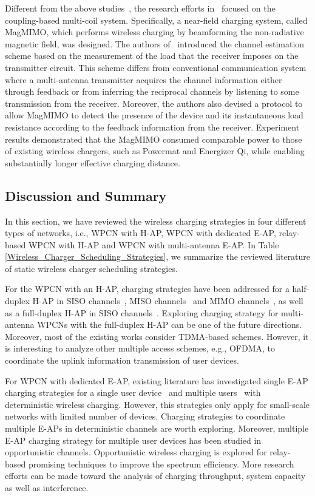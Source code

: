 \documentclass[twocolumn,10pt]{IEEEtran}
\begin{document}
Different from the above studies~\cite{G.YangTSP,Y.1403.7870Zeng,Y.Zeng2015}, the research efforts in~\cite{J.2014Jadidian} focused on the coupling-based multi-coil system. Specifically, a near-field charging system, called MagMIMO, which performs wireless charging by beamforming the non-radiative magnetic field, was designed. The authors of~\cite{J.2014Jadidian} introduced the channel estimation scheme based on the measurement of the load that the receiver imposes on the transmitter circuit. This scheme differs from conventional communication system where a multi-antenna transmitter acquires the channel information either through feedback or from inferring the reciprocal channels by listening to some transmission from the receiver. 
Moreover, the authors also devised a protocol to allow MagMIMO to detect the presence of the device and its instantaneous load resistance according to the feedback information from the receiver. Experiment results demonstrated that the MagMIMO consumed comparable power to those of existing wireless chargers, such as Powermat and Energizer Qi, while enabling substantially longer effective charging distance. 





\subsection{Discussion and Summary }
In this section, we have reviewed the wireless charging strategies in four different types of networks, i.e., WPCN with H-AP, WPCN with dedicated E-AP, relay-based WPCN with H-AP and WPCN with multi-antenna E-AP. In Table \ref{Wireless_Charger_Scheduling_Strategies}, we summarize the reviewed literature of static wireless charger scheduling strategies.  

For the WPCN with an H-AP, charging strategies have been addressed for a half-duplex H-AP in SISO channels~\cite{2014H.Ju}, MISO channels~\cite{L.2014Liu} and MIMO channels~\cite{G.1403.3991Yang}, as well as a full-duplex H-AP in SISO channels~\cite{H.2014Ju}. Exploring charging strategy for multi-antenna WPCNs with the full-duplex H-AP can be one of the future directions. Moreover, most of the existing works consider TDMA-based schemes. However, it is interesting to analyze other multiple access schemes, e.g., OFDMA, to coordinate the uplink information transmission of user devices.

For WPCN with dedicated E-AP, existing literature has investigated single E-AP charging strategies for a single user device~\cite{X.2014Zhou} and multiple users~\cite{Q.2014Sun} with deterministic wireless charging. However, this strategies only apply for small-scale networks with limited number of devices. Charging strategies to coordinate multiple E-APs in deterministic channels are worth exploring. Moreover, multiple E-AP charging strategy for multiple user devices has been studied in opportunistic channels. Opportunistic wireless charging is explored for relay-based promising techniques to improve the spectrum efficiency. More research efforts can be made toward the analysis of charging throughput, system capacity as well as interference. 
\end{document}
